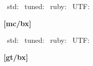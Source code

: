 \documentclass[a4paper,titlepage,dvipdfmx]{\class}
\begin{document}
\clearpage
[mc/m]






~std:%
~tuned:%
~ruby:%
~UTF:
\vspace{\baselineskip}

{\bfseries%
[mc/bx]






}

\ifdeluxe
{\ltseries%
[mc/l]





}
\fi

{\gtfamily
[gt/m]






~std:%
~tuned:%
~ruby:%
~UTF:
\vspace{\baselineskip}

{\bfseries%
[gt/bx]





}

\ifdeluxe
{\ebseries%
[gt/eb]





}
\fi

}

{\mgfamily
[mg/m]





}
\end{document}
